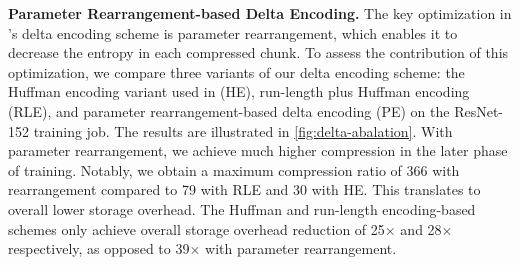 \noindent\textbf{Parameter Rearrangement-based Delta Encoding.} 
The key optimization in \sys's delta encoding scheme is parameter rearrangement, which enables it to decrease the entropy in each compressed chunk. 
To assess the contribution of this optimization, we compare three variants of our delta encoding scheme: the Huffman encoding variant used in \QD (HE), run-length plus Huffman encoding (RLE), and parameter rearrangement-based delta encoding (PE) on the ResNet-152 training job. The results are illustrated in \cref{fig:delta-abalation}. With parameter rearrangement, we achieve much higher compression in the later phase of training. Notably, we obtain a maximum compression ratio of 366 with rearrangement compared to 79 with RLE and 30 with HE. This translates to overall lower storage overhead. The Huffman and run-length encoding-based schemes only achieve overall storage overhead reduction of 25$\times$ and 28$\times$ respectively, as opposed to 39$\times$ with parameter rearrangement.

